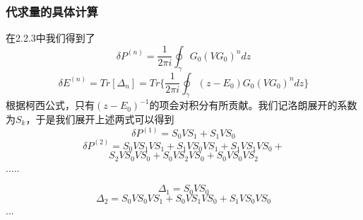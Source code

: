 \documentclass[12pt, a4paper, oneside]{ctexart}
\begin{document}
\subsubsection{代求量的具体计算}
在2.2.3中我们得到了
\begin{equation}
    \delta P^{(n)}=\frac{1}{2\pi i}\oint_{\gamma}G_0(VG_0)^ndz
\end{equation}
\begin{equation}
    \delta E^{(n)}= Tr[\Delta_n]=Tr\{\frac{1}{2\pi i}\oint _{\gamma}(z-E_0)G_0(VG_0)^ndz\}
\end{equation}
根据柯西公式，只有$(z-E_0)^{-1}$的项会对积分有所贡献。我们记洛朗展开的系数为$S_k$，于是我们展开上述两式可以得到
\begin{equation}
    \delta P^{(1)}=S_0VS_1+S_1VS_0
\end{equation}
\begin{equation}
    \delta P^{(2)}=S_0VS_1VS_1+S_1VS_0VS_1+S_1VS_1VS_0+
\end{equation}
\begin{equation}
    S_2VS_0VS_0+S_0VS_2VS_0+S_0VS_0VS_2
\end{equation}
        \qquad \qquad \qquad .....
        
\newpage
\begin{equation}
    \Delta _1=S_0VS_0
\end{equation}
\begin{equation}
    \Delta_2=S_0VS_0VS_1+S_0VS_1VS_0+S_1VS_0VS_0
\end{equation}
...
\end{document}
